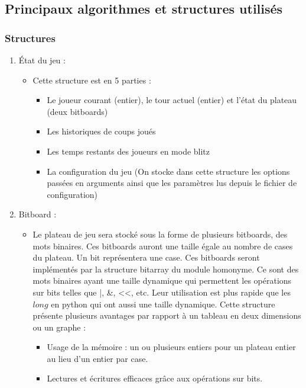 \documentclass{article}
\begin{document}
\subsection{Principaux algorithmes et structures utilisés}

\subsubsection{Structures}

\begin{enumerate}
    \item État du jeu : 
        \begin{itemize}
            \item Cette structure est en 5 parties :
            \begin{itemize}
                \item Le joueur courant (entier), le tour actuel (entier) et l'état du plateau (deux bitboards)
                \item Les historiques de coups joués
                \item Les temps restants des joueurs en mode blitz
                \item La configuration du jeu (On stocke dans cette structure les options passées en arguments ainsi que les paramètres lus depuis le fichier de configuration)
            \end{itemize}
        \end{itemize}
    \item Bitboard :
        \begin{itemize}
            \item Le plateau de jeu sera stocké sous la forme de plusieurs bitboards, des mots binaires. Ces bitboards auront une taille égale au nombre de cases du plateau. Un bit représentera une case. Ces bitboards seront implémentés par la structure bitarray du module homonyme. Ce sont des mots binaires ayant une taille dynamique qui permettent les opérations sur bits telles que |, \&, <<, etc. Leur utilisation est plus rapide que les $long$ en python qui ont aussi une taille dynamique. Cette structure présente plusieurs avantages par rapport à un tableau en deux dimensions ou un graphe :
            \begin{itemize}
                \item Usage de la mémoire : un ou plusieurs entiers pour un plateau entier au lieu d’un entier par case.
                \item Lectures et écritures efficaces grâce aux opérations sur bits.

\end{itemize}
\end{itemize}
\end{enumerate}
\end{document}
